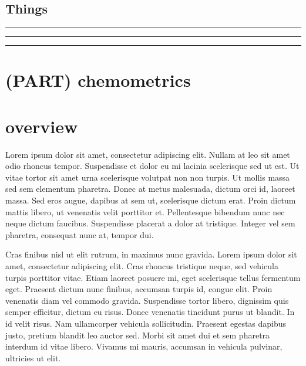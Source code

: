 \documentclass[
]{krantz}
\begin{document}
\hypertarget{things-2}{%
\subsection{Things}\label{things-2}}

\begin{center}\rule{0.5\linewidth}{0.5pt}\end{center}

\begin{center}\rule{0.5\linewidth}{0.5pt}\end{center}

\begin{center}\rule{0.5\linewidth}{0.5pt}\end{center}

\hypertarget{part-chemometrics}{%
\section{(PART) chemometrics}\label{part-chemometrics}}

\hypertarget{overview}{%
\section{overview}\label{overview}}

Lorem ipsum dolor sit amet, consectetur adipiscing elit. Nullam at leo sit amet odio rhoncus tempor. Suspendisse et dolor eu mi lacinia scelerisque sed ut est. Ut vitae tortor sit amet urna scelerisque volutpat non non turpis. Ut mollis massa sed sem elementum pharetra. Donec at metus malesuada, dictum orci id, laoreet massa. Sed eros augue, dapibus at sem ut, scelerisque dictum erat. Proin dictum mattis libero, ut venenatis velit porttitor et. Pellentesque bibendum nunc nec neque dictum faucibus. Suspendisse placerat a dolor at tristique. Integer vel sem pharetra, consequat nunc at, tempor dui.

Cras finibus nisl ut elit rutrum, in maximus nunc gravida. Lorem ipsum dolor sit amet, consectetur adipiscing elit. Cras rhoncus tristique neque, sed vehicula turpis porttitor vitae. Etiam laoreet posuere mi, eget scelerisque tellus fermentum eget. Praesent dictum nunc finibus, accumsan turpis id, congue elit. Proin venenatis diam vel commodo gravida. Suspendisse tortor libero, dignissim quis semper efficitur, dictum eu risus. Donec venenatis tincidunt purus ut blandit. In id velit risus. Nam ullamcorper vehicula sollicitudin. Praesent egestas dapibus justo, pretium blandit leo auctor sed. Morbi sit amet dui et sem pharetra interdum id vitae libero. Vivamus mi mauris, accumsan in vehicula pulvinar, ultricies ut elit.
\end{document}
